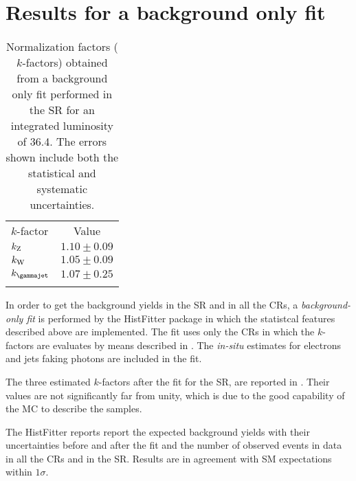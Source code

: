 \section{Results for a background only fit}
\begin{table}[t]
\centering
\begin{tabular}{lc}
\noalign{\smallskip}\toprule\noalign{\smallskip}
$k$-factor&Value\\
\noalign{\smallskip}\midrule\noalign{\smallskip}
$k_{\textup{Z}}$& $1.10\pm0.09$\\
$k_{\textup{W}}$& $1.05\pm0.09$\\
$k_{\textup{\gammajet}}$& $1.07\pm0.25$\\
\noalign{\smallskip}\bottomrule\noalign{\smallskip}
\end{tabular}
\caption{Normalization factors ($k$-factors) obtained from a background only fit performed in the SR for an integrated luminosity of \SI{36.4}{\ifb}. The errors shown include both the statistical and systematic uncertainties.}
\label{tab:kfactors}
\end{table}
In order to get the background yields in the SR and in all the CRs, a \emph{background-only fit} is performed by the HistFitter package in which the statistcal features described above are implemented. The fit uses only the CRs in which the $k$-factors are evaluates by means described in \Sect{\ref{sec:kfactor}}. The \emph{in-situ} estimates for electrons and jets faking photons are included in the fit. 

The three estimated $k$-factors after the fit for the SR, are reported in \Tab{\ref{tab:kfactors}}. Their values are not significantly far from unity, which is due to the good capability of the MC to describe the samples.

The HistFitter \Tab{\ref{table.results.systematics.in.logL.fit.table.results.yields}} reports report the expected background yields with their uncertainties before and after the fit and the number of observed events in data in all the CRs and in the SR. Results are in agreement with SM expectations within $1\sigma$.










